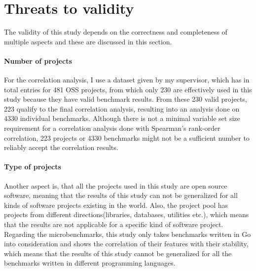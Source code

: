 \documentclass{seal_thesis}
\begin{document}
\section{Threats to validity}

The validity of this study depends on the correctness and completeness of multiple aspects and these are discussed in this section.

\paragraph{Number of projects}
For the correlation analysis, I use a dataset given by my supervisor, which has in total entries for 481 OSS projects, from which only 230 are effectively used in this study because they have valid benchmark results. From these 230 valid projects, 223 qualify to the final correlation analysis, resulting into an analysis done on 4330 individual benchmarks. Although there is not a minimal variable set size requirement for a correlation analysis done with Spearman's rank-order correlation, 223 projects or 4330 benchmarks might not be a sufficient number to reliably accept the correlation results. 

\paragraph{Type of projects}
Another aspect is, that all the projects used in this study are open source software, meaning that the results of this study can not be generalized for all kinds of software projects existing in the world. Also, the project pool has projects from different directions(libraries, databases, utilities etc.), which means that the results are not applicable for a specific kind of software project. Regarding the microbenchmarks, this study only takes benchmarks written in Go into consideration and shows the correlation of their features with their stability, which means that the results of this study cannot be generalized for all the benchmarks written in different programming languages.
\end{document}
